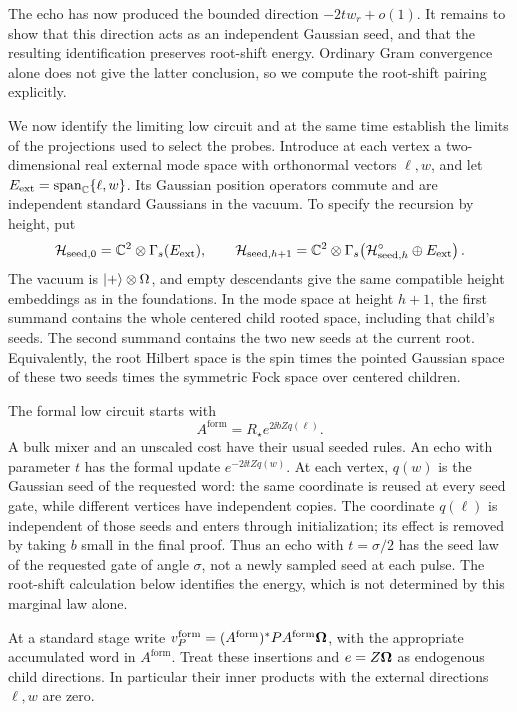 The echo has now produced the bounded direction \(-2t w_r+o(1)\).
It remains to show that this direction acts as an independent Gaussian
seed, and that the resulting identification preserves root-shift
energy.  Ordinary Gram convergence alone does not give the latter
conclusion, so we compute the root-shift pairing explicitly.

We now identify the limiting low circuit and at the same time establish
the limits of the projections used to select the probes.  Introduce at
each vertex a two-dimensional real external mode space with orthonormal
vectors \(\ell,w\), and let \(E_{\mathrm{ext}}=\operatorname{span}_{\mathbb C}\{\ell,w\}\).
Its Gaussian position operators commute and are independent standard
Gaussians in the vacuum.  To specify the recursion by height, put
\[
 \mathcal H_{\mathrm{seed},0}=\mathbb C^2\otimes\Gamma_s(E_{\mathrm{ext}}),
 \qquad
 \mathcal H_{\mathrm{seed},h+1}
 =\mathbb C^2\otimes\Gamma_s\!\left(
    \mathcal H_{\mathrm{seed},h}^{\circ}\oplus E_{\mathrm{ext}}\right).
\]
The vacuum is \(\lvert +\rangle\otimes\Omega\), and empty descendants give the
same compatible height embeddings as in the foundations.  In the mode
space at height \(h+1\), the first summand contains the whole centered
child rooted space, including that child's seeds.  The second summand
contains the two new seeds at the current root.  Equivalently, the root
Hilbert space is the spin times the pointed Gaussian space of these two
seeds times the symmetric Fock space over centered children.

The formal low circuit starts with
\begin{equation}
\label{eq:seed-formal-initialization}
 A^{\mathrm{form}}=R_\star e^{2\ii bZq(\ell)}.
\end{equation}
A bulk mixer and an unscaled cost have their usual seeded rules.  An
echo with parameter \(t\) has the formal update
\(e^{-2\ii t Zq(w)}\). At each vertex, \(q(w)\) is the Gaussian
seed of the requested word: the same coordinate is reused at every
seed gate, while different vertices have independent copies.
The coordinate \(q(\ell)\) is independent of those seeds and enters
through initialization; its effect is removed by taking \(b\) small
in the final proof. Thus an echo with \(t=\sigma/2\) has the seed
law of the requested gate of angle \(\sigma\), not a newly sampled
seed at each pulse. The root-shift calculation below identifies the
energy, which is not determined by this marginal law alone.

At a standard stage write
\(v_P^{\mathrm{form}}=(A^{\mathrm{form}})^*P
A^{\mathrm{form}}\boldsymbol\Omega\), with the appropriate accumulated word in
\(A^{\mathrm{form}}\).  Treat these insertions and \(e=Z\boldsymbol\Omega\) as
endogenous child directions.  In particular their inner products with
the external directions \(\ell,w\) are zero.

